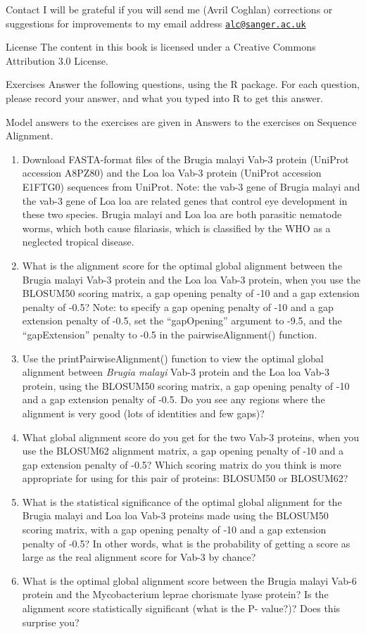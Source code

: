 \documentclass[
]{book}
\providecommand{\tightlist}{%
  \setlength{\itemsep}{0pt}\setlength{\parskip}{0pt}}
\begin{document}
Contact
I will be grateful if you will send me (Avril Coghlan) corrections or suggestions for improvements to my email address \href{mailto:alc@sanger.ac.uk}{\nolinkurl{alc@sanger.ac.uk}}

License
The content in this book is licensed under a Creative Commons Attribution 3.0 License.

Exercises
Answer the following questions, using the R package. For each question, please record your answer, and what you typed into R to get this answer.

Model answers to the exercises are given in Answers to the exercises on Sequence Alignment.

\begin{enumerate}
\def\labelenumi{\arabic{enumi}.}
\tightlist
\item
  Download FASTA-format files of the Brugia malayi Vab-3 protein (UniProt accession A8PZ80) and the Loa loa Vab-3 protein (UniProt accession E1FTG0) sequences from UniProt.
  Note: the vab-3 gene of Brugia malayi and the vab-3 gene of Loa loa are related genes that control eye development in these two species. Brugia malayi and Loa loa are both parasitic nematode worms, which both cause filariasis, which is classified by the WHO as a neglected tropical disease.
\item
  What is the alignment score for the optimal global alignment between the Brugia malayi Vab-3 protein and the Loa loa Vab-3 protein, when you use the BLOSUM50 scoring matrix, a gap opening penalty of -10 and a gap extension penalty of -0.5?
  Note: to specify a gap opening penalty of -10 and a gap extension penalty of -0.5, set the ``gapOpening'' argument to -9.5, and the ``gapExtension'' penalty to -0.5 in the pairwiseAlignment() function.
\item
  Use the printPairwiseAlignment() function to view the optimal global alignment between \emph{Brugia malayi} Vab-3 protein and the Loa loa Vab-3 protein, using the BLOSUM50 scoring matrix, a gap opening penalty of -10 and a gap extension penalty of -0.5.
  Do you see any regions where the alignment is very good (lots of identities and few gaps)?
\item
  What global alignment score do you get for the two Vab-3 proteins, when you use the BLOSUM62 alignment matrix, a gap opening penalty of -10 and a gap extension penalty of -0.5?
  Which scoring matrix do you think is more appropriate for using for this pair of proteins: BLOSUM50 or BLOSUM62?
\item
  What is the statistical significance of the optimal global alignment for the Brugia malayi and Loa loa Vab-3 proteins made using the BLOSUM50 scoring matrix, with a gap opening penalty of -10 and a gap extension penalty of -0.5?
  In other words, what is the probability of getting a score as large as the real alignment score for Vab-3 by chance?
\item
  What is the optimal global alignment score between the Brugia malayi Vab-6 protein and the Mycobacterium leprae chorismate lyase protein?
  Is the alignment score statistically significant (what is the P- value?)? Does this surprise you?
\end{enumerate}
\end{document}
